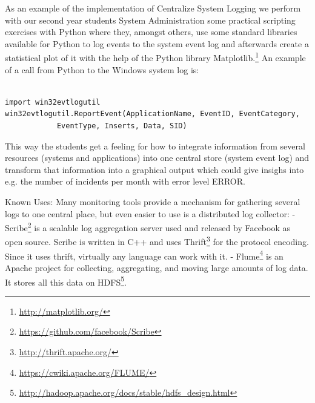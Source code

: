 
\begin{center}
   
\end{center}

As an example of the implementation of {\sc Centralize System Logging} we perform with our second year students System Administration some practical scripting exercises with Python where they, amongst others, use some standard libraries available for Python to log events to the system event log and afterwards create a statistical plot of it with the help of the Python library Matplotlib.\footnote{\url{http://matplotlib.org/}} 
An example of a call from Python to the Windows system log is:

               
\lstset{language=Python}

\begin{lstlisting}

import win32evtlogutil
win32evtlogutil.ReportEvent(ApplicationName, EventID, EventCategory,
    		EventType, Inserts, Data, SID)

\end{lstlisting}


This way the students get a feeling for how to integrate information from several resources (systems and applications) into one central store (system event log) and transform that information into a graphical output which could give insighs into e.g. the number of incidents per month with error level ERROR.

\begin{center}
   
\end{center}

Known Uses:
Many monitoring tools provide a mechanism for gathering several logs to one central place, but even easier to use is a distributed log collector:
- Scribe\footnote{\url{https://github.com/facebook/Scribe}} is a scalable log aggregation server used and released by Facebook as open source. Scribe is written in C++ and uses Thrift\footnote{\url{http://thrift.apache.org/}} for the protocol encoding. Since it uses thrift, virtually any language can work with it.
- Flume\footnote{\url{https://cwiki.apache.org/FLUME/}} is an Apache project for collecting, aggregating, and moving large amounts of log data. It stores all this data on HDFS\footnote{\url{http://hadoop.apache.org/docs/stable/hdfs_design.html}}.





